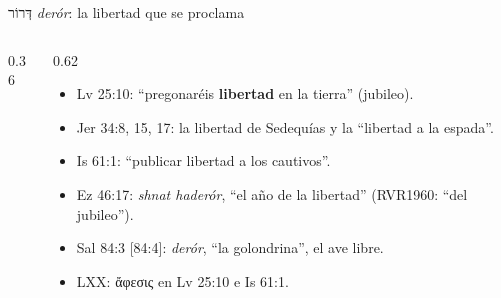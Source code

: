 \documentclass[hyperref={bookmarks=false},aspectratio=169]{beamer}
\newcommand{\heb}[1]{\mbox{\foreignlanguage{hebrew}{#1}}}
\newcommand{\grc}[1]{\foreignlanguage{ancientgreek}{#1}}
\newcommand{\destacar}[1]{\textbf{\textcolor{tierraroja}{#1}}}
\begin{document}
\begin{frame}{\heb{דְּרוֹר} \emph{derór}: la libertad que se proclama}
\begin{columns}[c,onlytextwidth]
\begin{column}{0.36\textwidth}
\centering
{}
\end{column}
\begin{column}{0.62\textwidth}\small
\begin{itemize}
\item Lv 25:10: ``pregonaréis \destacar{libertad} en la tierra'' (jubileo).
\item Jer 34:8, 15, 17: la libertad de Sedequías y la ``libertad a la espada''.
\item Is 61:1: ``publicar libertad a los cautivos''.
\item Ez 46:17: \emph{shnat haderór}, ``el año de la libertad'' (RVR1960: ``del jubileo'').
\item Sal 84:3 [84:4]: \emph{derór}, ``la golondrina'', el ave libre.
\item LXX: \grc{ἄφεσις} en Lv 25:10 e Is 61:1.
\end{itemize}
\end{column}
\end{columns}
\end{frame}
\end{document}
